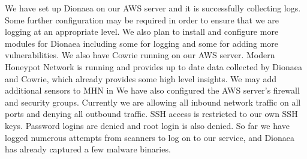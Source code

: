 We have set up Dionaea on our AWS server and it is successfully collecting logs. Some further configuration may be required in order to ensure that we are logging at an appropriate level. We also plan to install and configure more modules for Dionaea including some for logging and some for adding more vulnerabilities. We also have Cowrie running on our AWS server. Modern Honeypot Network is running and provides up to date data collected by Dionaea and Cowrie, which already provides some high level insights. We may add additional sensors to MHN in  We have also configured the AWS server's firewall and security groups. Currently we are allowing all inbound network traffic on all ports and denying all outbound traffic. SSH access is restricted to our own SSH keys. Password logins are denied and root login is also denied. So far we have logged numerous attempts from scanners to log on to our service, and Dionaea has already captured a few malware binaries. 

